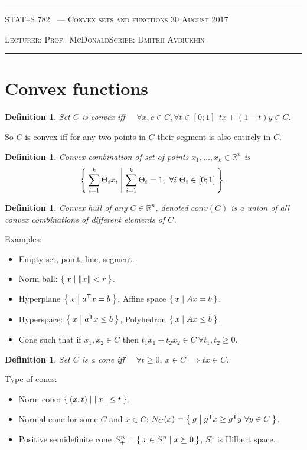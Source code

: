 \documentclass[10pt]{article}
\newcounter{lecnum}
\newtheorem{definition}[def]{Definition}
\newcommand{\R}{\mathbb{R}}
\newcommand{\norm}[1]{\left\lVert #1 \right\rVert}
\newcommand{\Rn}{\R^n}
\newcommand{\sumi}[2]{\sum\limits_{#1=1}^{#2}}
\newcommand{\TODO}[1]{\textbf{\color{red} TODO: #1}}
\newcommand{\trans}[1]{{#1}^\mathsf{T}}
\newcommand{\lecturer}{Prof.\ McDonald}
\newcommand{\scribe}{Dmitrii Avdiukhin}
\newcommand{\chtitle}{Convex sets and functions}
\newcommand{\lecdate}{30 August 2017}
\begin{document}
\rule{6.5in}{1pt}

\textsc{STAT--S 782
        \hfill \thelecnum\ --- \chtitle
        \hfill \lecdate}

\textsc{Lecturer: \lecturer \hfill Scribe: \scribe}
\rule{6.5in}{1pt}



\section{Convex functions}
\label{sec:convex-functions}

\begin{definition}
  Set $C$ is \emph{convex} iff \ \ $\forall x,c \in C, \forall t \in [0; 1]\ \ t x + (1-t) y \in C.$
\end{definition}
So $C$ is convex iff for any two points in $C$ their segment is also entirely in $C$.
\begin{definition}
  \emph{Convex combination} of set of points $x_1, \ldots, x_k \in \Rn$ is
  \[\Set{\sumi ik \Theta_i x_i | \sumi ik \Theta_i=1,\ \forall i\ \Theta_i \in [0; 1]}.\]
\end{definition}

\begin{definition}
  \emph{Convex hull} of any $C \in \Rn$, denoted $conv(C)$ is a union of all convex combinations of different elements of $C$.
\end{definition}

Examples:
\begin{itemize}
  \item Empty set, point, line, segment.
  \item Norm ball: $\Set{x | \norm x < r}$.
  \item Hyperplane $\Set{x | \trans{a} x = b}$, Affine space $\Set{x | A x = b}$.
  \item Hyperspace: $\Set{x | \trans{a} x \leq b}$, Polyhedron $\Set{x | A x \leq b}$.
  \item Cone such that if $x_1, x_2 \in C$ then $t_1 x_1 + t_2 x_2 \in C \ \forall t_1, t_2 \geq 0$.
\end{itemize}
\begin{definition}
  Set $C$ is a \emph{cone} iff \ \ $\forall t \geq 0,\ x \in C \implies t x \in C$.
\end{definition}
Type of cones:
\begin{itemize}
  \item Norm cone: $\Set{(x,t) | \norm x \leq t}$.
  \item Normal cone for some $C$ and $x \in C$: $N_C(x) = \Set{g | \trans g x \geq \trans g y \ \forall y \in C}$.
  \item Positive semidefinite cone $S_+^n = \Set{x \in S^n | x \succeq 0}$, $S^n$ is Hilbert space.
\end{itemize}
\end{document}

